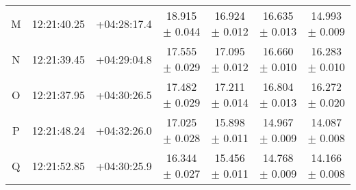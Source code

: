 \begin{table*}
\begin{tabular}{c c c c c c c }
M        & 12:21:40.25  & +04:28:17.4     &  18.915 $\pm$ 0.044	 & 	16.924 $\pm$ 0.012 	 & 	16.635 $\pm$  	0.013	 & 	14.993  $\pm$   0.009 \\
N        & 12:21:39.45  & +04:29:04.8     &  17.555 $\pm$ 0.029	 & 	17.095 $\pm$ 0.012 	 & 	16.660 $\pm$  	0.010	 & 	16.283  $\pm$   0.010 \\
O        & 12:21:37.95  & +04:30:26.5     &  17.482 $\pm$ 0.029	 & 	17.211 $\pm$ 0.014 	 & 	16.804 $\pm$  	0.013	 & 	16.272  $\pm$   0.020 \\
P        & 12:21:48.24  & +04:32:26.0     &  17.025 $\pm$ 0.028	 & 	15.898 $\pm$ 0.011 	 & 	14.967 $\pm$  	0.009	 & 	14.087  $\pm$   0.008 \\
Q        & 12:21:52.85  & +04:30:25.9     &  16.344 $\pm$ 0.027	 & 	15.456 $\pm$ 0.011 	 & 	14.768 $\pm$  	0.009	 & 	14.166  $\pm$   0.008 \\ 
\hline                                   
\end{tabular}
\label{tab:standard_star_table}      
\end{table*}


